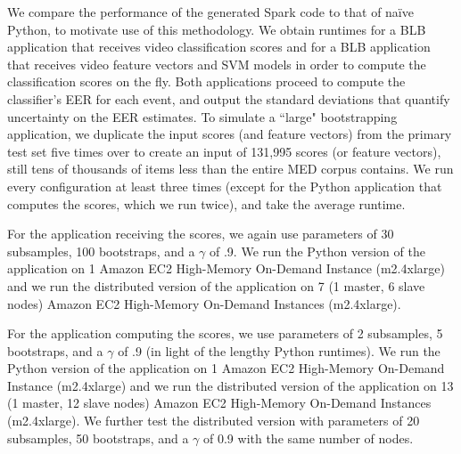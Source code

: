 We compare the performance of the generated Spark code to that of na\"{i}ve Python, to motivate use of this methodology. 
We obtain runtimes for a BLB application that receives video classification scores and for a BLB application that receives video feature vectors and SVM models in order to compute the classification scores on the fly. 
Both applications proceed to compute the classifier's EER for each event, and output the standard deviations that quantify uncertainty on the EER estimates. 
To simulate a ``large" bootstrapping application, we duplicate the input scores (and feature vectors) from the primary test set five times over to create an input of 131,995 scores (or feature vectors), still tens of thousands of items less than the entire MED corpus contains. 
We run every configuration at least three times (except for the Python application that computes the scores, which we run twice), and take the average runtime. 

For the application receiving the scores, we again use parameters of 30 subsamples, 100 bootstraps, and a $\gamma$ of .9. We run the Python version of the application on 1 Amazon EC2 \cite{ec2} High-Memory On-Demand Instance (m2.4xlarge) and we run the distributed version of the application on 7 (1 master, 6 slave nodes) Amazon EC2 High-Memory On-Demand Instances (m2.4xlarge). 

For the application computing the scores, we use parameters of 2 subsamples, 5 bootstraps, and a $\gamma$ of .9 (in light of the lengthy Python runtimes). We run the Python version of the application on 1 Amazon EC2 \cite{ec2} High-Memory On-Demand Instance (m2.4xlarge) and we run the distributed version of the application on 13 (1 master, 12 slave nodes) Amazon EC2 High-Memory On-Demand Instances (m2.4xlarge). We further test the distributed version with parameters of 20 subsamples, 50	bootstraps, and a $\gamma$ of 0.9 with the same number of nodes. 




